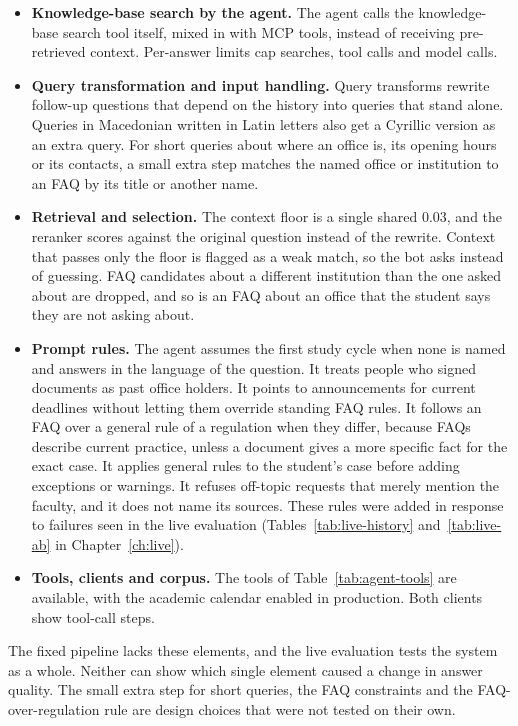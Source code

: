 \begin{itemize}
  \item \textbf{Knowledge-base search by the agent.} The agent calls the knowledge-base search tool itself, mixed in with MCP tools, instead of receiving pre-retrieved context. Per-answer limits cap searches, tool calls and model calls.
  \item \textbf{Query transformation and input handling.} Query transforms rewrite follow-up questions that depend on the history into queries that stand alone. Queries in Macedonian written in Latin letters also get a Cyrillic version as an extra query. For short queries about where an office is, its opening hours or its contacts, a small extra step matches the named office or institution to an FAQ by its title or another name.
  \item \textbf{Retrieval and selection.} The context floor is a single shared 0.03, and the reranker scores against the original question instead of the rewrite. Context that passes only the floor is flagged as a weak match, so the bot asks instead of guessing. FAQ candidates about a different institution than the one asked about are dropped, and so is an FAQ about an office that the student says they are not asking about.
  \item \textbf{Prompt rules.} The agent assumes the first study cycle when none is named and answers in the language of the question. It treats people who signed documents as past office holders. It points to announcements for current deadlines without letting them override standing FAQ rules. It follows an FAQ over a general rule of a regulation when they differ, because FAQs describe current practice, unless a document gives a more specific fact for the exact case. It applies general rules to the student's case before adding exceptions or warnings. It refuses off-topic requests that merely mention the faculty, and it does not name its sources. These rules were added in response to failures seen in the live evaluation (Tables~\ref{tab:live-history} and~\ref{tab:live-ab} in Chapter~\ref{ch:live}).
  \item \textbf{Tools, clients and corpus.} The tools of Table~\ref{tab:agent-tools} are available, with the academic calendar enabled in production. Both clients show tool-call steps.
\end{itemize}

The fixed pipeline lacks these elements, and the live evaluation tests the system as a whole. Neither can show which single element caused a change in answer quality. The small extra step for short queries, the FAQ constraints and the FAQ-over-regulation rule are design choices that were not tested on their own.


